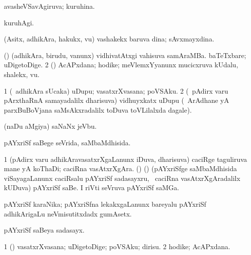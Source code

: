\bentry
{} 
\gl{\gu}
\expl{}
\bmng
 avasheVSavAgiruva; kuruhina. 
\emng
\eentry

\bentry 
{} 
\gl{\kirxvi}
\expl{}
\bmng
 kuruhAgi. 
\emng
\eentry

\bentry
{}
\gl{\nA}
\expl{}
\bmng
 (Asitx, adhikAra, hakukx, \mo vu) vashakekx baruva dina; sAvxmayxdina. 
\emng
\eentry

\bentry
{} 
\gl{\nA}
\expl{}
\bmng
\bnum
{} (\pArxparx) 
\banum
{} (adhikAra, birudu, \mo vanunx) vidhivatAtxgi vahisuva samAraMBa. 
 baTeTxbare; uDigetoDige. 
\eanum
\numie
\num{2} (\pArxvi) AcAPxdana; hodike; meVlemxYyanunx mucicxruva kUdalu, shalekx, \mo vu. 
\enum
\emng
\eentry

\bentry
{} 
\gl{\nA}
\expl{}
\bmng
\bnum
\num{1} (\kanmu\ adhikAra sUcaka) uDupu; vasatxrXvasana; poVSAku. 
\num{2} (\kanmu\ pAdirx \mo varu pArxthaRnA samayadalilx dharisuva) vidhuyxkatx uDupu (\kanmu\ ArAdhane yA parxBuBoVjana saMsAkxradalilx toDuva toVLilalxda dagale). 
\enum
\emng
\eentry

\bentry
{} 
\gl{\nA}
\expl{}
\bmng
 (naDu aMgiya) saNaNx jeVbu. 
\emng
\eentry

\bentry
{} 
\gl{\gu}
\expl{}
\bmng
 pAYxriSf saBege seVrida, saMbaMdhisida. 
\emng
\eentry

\bentry
{} 
\gl{\nA}
\bmng
\bnum
\num{1} (pAdirx \mo varu adhikAravasatxrXgaLanunx iDuva, dharisuva) caciRge taguliruva mane yA koThaDi; caciRna vasAtxrXgAra. 
 (\ca) (\birx) 
\banum
{} (pAYxriSfge saMbaMdhisida viSayagaLanunx caciRsalu pAYxriSf sadasayxru, \kanmu\ caciRna vasAtxrXgAradalilx kUDuva) pAYxriSf saBe. 
 I riVti seVruva pAYxriSf saMGa. 
\eanum
\numie
\enum
\emng
\eentry

\bentry
{} 
\gl{\nA}
\expl{}
\bmng
 pAYxriSf karaNika; pAYxriSfna lekakxgaLanunx bareyalu pAYxriSf adhikArigaLu neVmisutitxdadx gumAsetx. 
\emng
\eentry

\bentry
{} 
\gl{\nA}
\bmng
 pAYxriSf saBeya sadasayx. 
\emng
\eentry

\bentry
{} 
\gl{\nA}
\expl{}
\bmng
\bnum
\num{1} (\kAparx) vasatxrXvasana; uDigetoDige; poVSAku; dirisu. 
\num{2} hodike; AcAPxdana. 
\enum
\emng
\eentry

